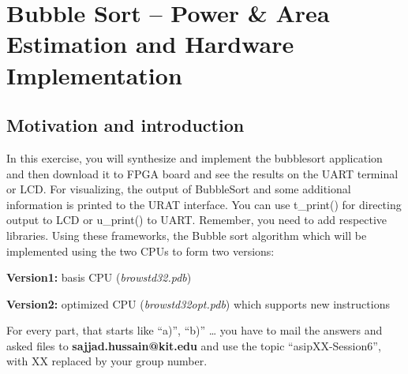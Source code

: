 \hypertarget{bubble-sort-power-area-estimation-and-hardware-implementation}{%
\chapter*{Bubble Sort -- Power \& Area Estimation and Hardware Implementation}\label{bubble-sort-power-area-estimation-and-hardware-implementation}}


\section*{Motivation and introduction}

In this exercise, you will synthesize and implement the bubblesort
application and then download it to FPGA board and see the results on
the UART terminal or LCD. For visualizing, the output of BubbleSort and
some additional information is printed to the URAT interface. You can
use t\_print() for directing output to LCD or u\_print() to UART.
Remember, you need to add respective libraries. Using these frameworks,
the Bubble sort algorithm which will be implemented using the two CPUs
to form two versions:

\textbf{Version1:} basis CPU (\emph{browstd32.pdb})

\textbf{Version2:} optimized CPU (\emph{browstd32opt.pdb}) which
supports new instructions

For every part, that starts like ``a)'', ``b)'' \ldots{} you have to
mail the answers and asked files to \textbf{sajjad.hussain@kit.edu} and
use the topic ``asipXX-Session6'', with XX replaced by your group
number.

